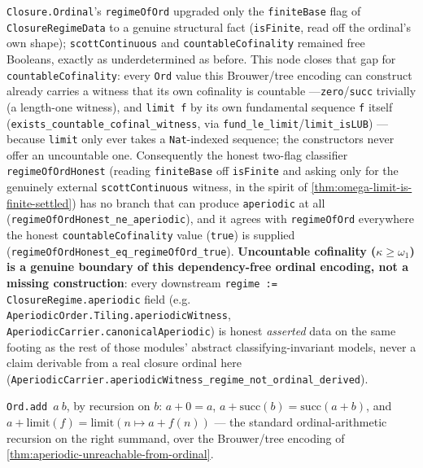 \begin{theorem}\label{thm:aperiodic-unreachable-from-ordinal}\leanok{}
\texttt{Closure.Ordinal}'s \texttt{regimeOfOrd} upgraded only the \texttt{finiteBase} flag of
\texttt{ClosureRegimeData} to a genuine structural fact (\texttt{isFinite}, read off the ordinal's own
shape); \texttt{scottContinuous} and \texttt{countableCofinality} remained free Booleans, exactly as
underdetermined as before. This node closes that gap for \texttt{countableCofinality}: every
\texttt{Ord} value this Brouwer/tree encoding can construct already carries a witness that its own
cofinality is countable ---\texttt{zero}/\texttt{succ} trivially (a length-one witness), and
\texttt{limit f} by its own fundamental sequence \texttt{f} itself
(\texttt{exists\_countable\_cofinal\_witness}, via \texttt{fund\_le\_limit}/\texttt{limit\_isLUB}) ---
because \texttt{limit} only ever takes a \texttt{Nat}-indexed sequence; the constructors never offer
an uncountable one. Consequently the honest two-flag classifier \texttt{regimeOfOrdHonest} (reading
\texttt{finiteBase} off \texttt{isFinite} and asking only for the genuinely external
\texttt{scottContinuous} witness, in the spirit of \cref{thm:omega-limit-is-finite-settled}) has no
branch that can produce \texttt{aperiodic} at all (\texttt{regimeOfOrdHonest\_ne\_aperiodic}), and it
agrees with \texttt{regimeOfOrd} everywhere the honest \texttt{countableCofinality} value (\texttt{true})
is supplied (\texttt{regimeOfOrdHonest\_eq\_regimeOfOrd\_true}). \textbf{Uncountable cofinality
($\kappa\ge\omega_1$) is a genuine boundary of this dependency-free ordinal encoding, not a missing
construction}: every downstream \texttt{regime := ClosureRegime.aperiodic} field (e.g.
\texttt{AperiodicOrder.Tiling.aperiodicWitness}, \texttt{AperiodicCarrier.canonicalAperiodic}) is
honest \emph{asserted} data on the same footing as the rest of those modules' abstract classifying-invariant
models, never a claim derivable from a real closure ordinal here
(\texttt{AperiodicCarrier.aperiodicWitness\_regime\_not\_ordinal\_derived}).
\end{theorem}

\begin{definition}\label{def:ord-add}\leanok
\texttt{Ord.add}\ $a\ b$, by recursion on $b$: $a+0=a$, $a+\mathrm{succ}(b)=\mathrm{succ}(a+b)$,
and $a+\mathrm{limit}(f)=\mathrm{limit}(n\mapsto a+f(n))$ --- the standard ordinal-arithmetic
recursion on the right summand, over the Brouwer/tree encoding of \cref{thm:aperiodic-unreachable-from-ordinal}.
\end{definition}


